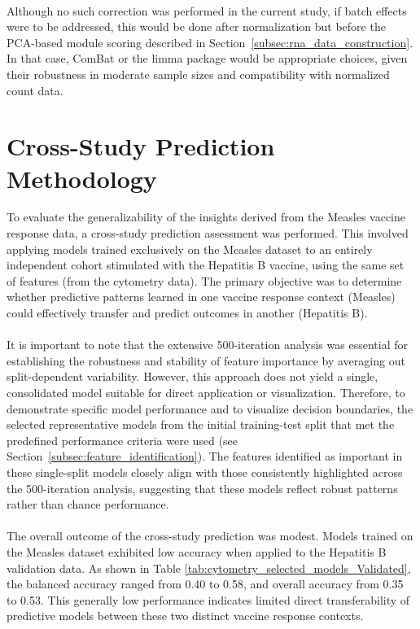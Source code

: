 \documentclass[12pt,a4paper]{report}
\begin{document}
\\
Although no such correction was performed in the current study, if batch effects were to be addressed, this would be done after normalization but before the PCA-based module scoring described in Section~\ref{subsec:rna_data_construction}. In that case, ComBat or the limma package would be appropriate choices, given their robustness in moderate sample sizes and compatibility with normalized count data.



\section{Cross-Study Prediction Methodology}
\noindent
To evaluate the generalizability of the insights derived from the Measles vaccine response data, a cross-study prediction assessment was performed. This involved applying models trained exclusively on the Measles dataset to an entirely independent cohort stimulated with the Hepatitis B vaccine, using the same set of features (from the cytometry data). The primary objective was to determine whether predictive patterns learned in one vaccine response context (Measles) could effectively transfer and predict outcomes in another (Hepatitis B).\\
\\
It is important to note that the extensive 500-iteration analysis was essential for establishing the robustness and stability of feature importance by averaging out split-dependent variability. However, this approach does not yield a single, consolidated model suitable for direct application or visualization. Therefore, to demonstrate specific model performance and to visualize decision boundaries, the selected representative models from the initial training-test split that met the predefined performance criteria were used (see Section~\ref{subsec:feature_identification}). The features identified as important in these single-split models closely align with those consistently highlighted across the 500-iteration analysis, suggesting that these models reflect robust patterns rather than chance performance.\\
\\
The overall outcome of the cross-study prediction was modest. Models trained on the Measles dataset exhibited low accuracy when applied to the Hepatitis B validation data. As shown in Table \ref{tab:cytometry_selected_models_Validated}, the balanced accuracy ranged from 0.40 to 0.58, and overall accuracy from 0.35 to 0.53. This generally low performance indicates limited direct transferability of predictive models between these two distinct vaccine response contexts.\\
\end{document}
